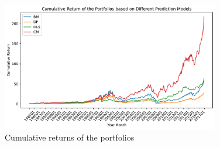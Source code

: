 \begin{enumerate}[(a)]
    

    \begin{figure}[htbp!]
        \centering
        \includegraphics[width=0.85\textwidth]{Out/Ex4_C.pdf}
        \caption{Cumulative returns of the portfolios}
        \label{fig:my_label}
    \end{figure}
\end{enumerate}